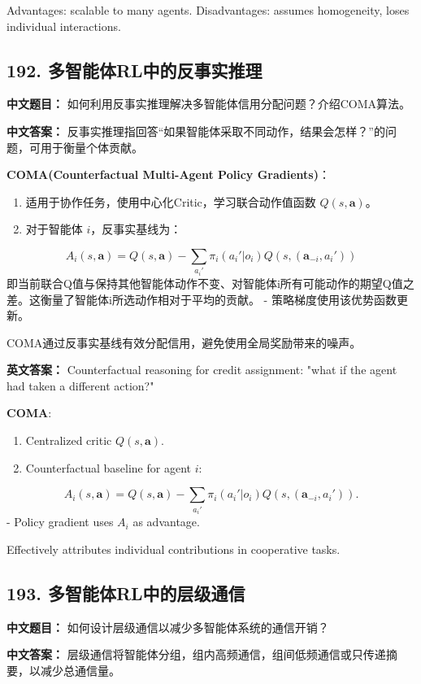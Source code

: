 \documentclass[10pt,a4paper]{ctexart}
\begin{document}
Advantages: scalable to many agents.
Disadvantages: assumes homogeneity, loses individual interactions.

\subsection*{192. 多智能体RL中的反事实推理}
\textbf{中文题目：} 如何利用反事实推理解决多智能体信用分配问题？介绍COMA算法。

\textbf{中文答案：}  
反事实推理指回答“如果智能体采取不同动作，结果会怎样？”的问题，可用于衡量个体贡献。

\textbf{COMA(Counterfactual Multi-Agent Policy Gradients)}：
\begin{enumerate}
    \item 适用于协作任务，使用中心化Critic，学习联合动作值函数 $Q(s, \mathbf{a})$。
    \item 对于智能体 $i$，反事实基线为：
\end{enumerate}
  \[
  A_i(s, \mathbf{a}) = Q(s, \mathbf{a}) - \sum_{a_i'} \pi_i(a_i' | o_i) Q(s, (\mathbf{a}_{-i}, a_i'))
  \]
  即当前联合Q值与保持其他智能体动作不变、对智能体i所有可能动作的期望Q值之差。这衡量了智能体i所选动作相对于平均的贡献。
- 策略梯度使用该优势函数更新。

COMA通过反事实基线有效分配信用，避免使用全局奖励带来的噪声。

\textbf{英文答案：}  
Counterfactual reasoning for credit assignment: "what if the agent had taken a different action?"

\textbf{COMA}:
\begin{enumerate}
    \item Centralized critic $Q(s, \mathbf{a})$.
    \item Counterfactual baseline for agent $i$:
\end{enumerate}
  \[
  A_i(s, \mathbf{a}) = Q(s, \mathbf{a}) - \sum_{a_i'} \pi_i(a_i'|o_i) Q(s, (\mathbf{a}_{-i}, a_i')).
  \]
- Policy gradient uses $A_i$ as advantage.

Effectively attributes individual contributions in cooperative tasks.

\subsection*{193. 多智能体RL中的层级通信}
\textbf{中文题目：} 如何设计层级通信以减少多智能体系统的通信开销？

\textbf{中文答案：}  
层级通信将智能体分组，组内高频通信，组间低频通信或只传递摘要，以减少总通信量。
\end{document}
